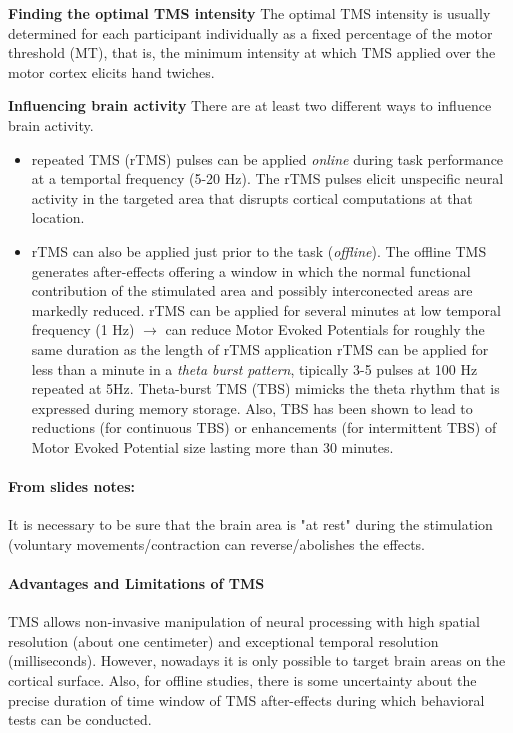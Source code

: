 \documentclass[12pt,article,oneside,a4paper]{memoir}
\begin{document}
\textbf{Finding the optimal TMS intensity} The optimal TMS intensity is usually determined for each participant individually as a fixed percentage of the motor threshold (MT), that is, the minimum intensity at which TMS applied over the motor cortex elicits hand twiches.

\textbf{Influencing brain activity} There are at least two different ways to influence brain activity. 
\begin{itemize}
\item repeated TMS (rTMS) pulses can be applied \textit{online} during task performance at a temportal frequency (5-20 Hz).
\subitem The rTMS pulses elicit unspecific neural activity in the targeted area that disrupts cortical computations at that location.
\item rTMS can also be applied just prior to the task (\textit{offline}). The offline TMS generates after-effects offering a window in which the normal functional contribution of the stimulated area and possibly interconected areas are markedly reduced.
\subitem rTMS can be applied for several minutes at low temporal frequency (1 Hz) $\rightarrow$ can reduce Motor Evoked Potentials for roughly the same duration as the length of rTMS application
\subitem rTMS can be applied for less than a minute in a \textit{theta burst pattern}, tipically 3-5 pulses at 100 Hz repeated at 5Hz. Theta-burst TMS (TBS) mimicks the theta rhythm that is expressed during memory storage. Also, TBS has been shown to lead to reductions (for continuous TBS) or enhancements (for intermittent TBS) of Motor Evoked Potential size lasting more than 30 minutes.
\end{itemize}

\paragraph{From slides notes:} It is necessary to be sure that the brain area is "at rest" during the stimulation (voluntary movements/contraction can reverse/abolishes the effects.

\paragraph{Advantages and Limitations of TMS} TMS allows non-invasive manipulation of neural processing with high spatial resolution (about one centimeter) and exceptional temporal resolution (milliseconds). However, nowadays it is only possible to target brain areas on the cortical surface. Also, for offline studies, there is some uncertainty about the precise duration of time window of TMS after-effects during which behavioral tests can be conducted.
\end{document}
